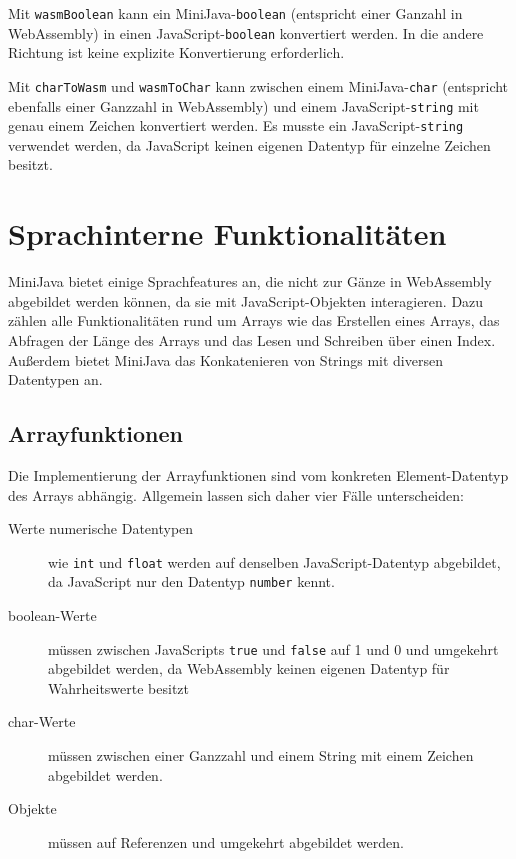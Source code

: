 

Mit \lstinline{wasmBoolean} kann ein MiniJava-\lstinline{boolean} (entspricht einer Ganzahl in WebAssembly) in einen JavaScript-\lstinline{boolean} konvertiert werden. In die andere Richtung ist keine explizite Konvertierung erforderlich.

Mit \lstinline{charToWasm} und \lstinline{wasmToChar} kann zwischen einem MiniJava-\lstinline{char} (entspricht ebenfalls einer Ganzzahl in WebAssembly) und einem JavaScript-\lstinline{string} mit genau einem Zeichen konvertiert werden.
Es musste ein JavaScript-\lstinline{string} verwendet werden, da JavaScript keinen eigenen Datentyp für einzelne Zeichen besitzt.

\section{Sprachinterne Funktionalitäten}

MiniJava bietet einige Sprachfeatures an, die nicht zur Gänze in WebAssembly abgebildet werden können, da sie mit JavaScript-Objekten interagieren. Dazu zählen alle Funktionalitäten rund um Arrays wie das Erstellen eines Arrays, das Abfragen der Länge des Arrays und das Lesen und Schreiben über einen Index. Außerdem bietet MiniJava das Konkatenieren von Strings mit diversen Datentypen an.

\subsection{Arrayfunktionen}

Die Implementierung der Arrayfunktionen sind vom konkreten Element-Datentyp des Arrays abhängig. Allgemein lassen sich daher vier Fälle unterscheiden:

\begin{description}
    \item[Werte numerische Datentypen] wie \lstinline{int} und \lstinline{float} werden auf denselben JavaScript-Daten\-typ abgebildet, da JavaScript nur den Datentyp \lstinline{number} kennt.
    \item[boolean-Werte] müssen zwischen JavaScripts \lstinline{true} und \lstinline{false} auf 1 und 0 und umgekehrt abgebildet werden, da WebAssembly keinen eigenen Datentyp für Wahrheitswerte besitzt
    \item[char-Werte] müssen zwischen einer Ganzzahl und einem String mit einem Zeichen abgebildet werden.
    \item[Objekte] müssen auf Referenzen und umgekehrt abgebildet werden. 
\end{description}

